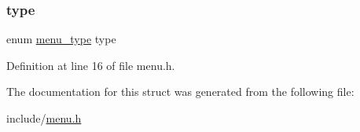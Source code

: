 \subsubsection{\texorpdfstring{type}{type}}
{\footnotesize\ttfamily enum \hyperlink{menu_8h_a6bbf4baf5018b0d76aab6c2e6bf85e62}{menu\+\_\+type} type}



Definition at line 16 of file menu.\+h.



The documentation for this struct was generated from the following file\+:\begin{DoxyCompactItemize}
\item 
include/\hyperlink{menu_8h}{menu.\+h}\end{DoxyCompactItemize}
